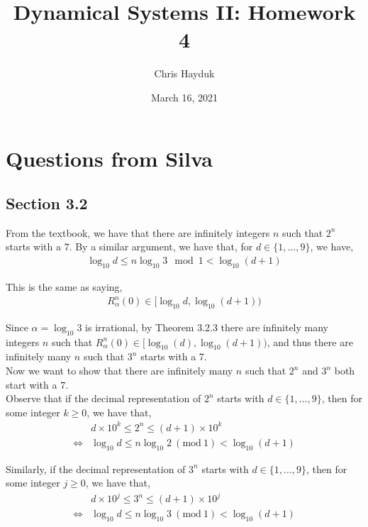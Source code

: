 \documentclass[12pt]{article}
\newenvironment{problem}[2][Problem]{\begin{trivlist}
\item[\hskip \labelsep {\bfseries #1}\hskip \labelsep {\bfseries #2.}]}{\end{trivlist}}
\newcommand{\Mod}[1]{\ (\mathrm{mod}\ #1)}
\begin{document}
\title{Dynamical Systems II: Homework 4}

\author{Chris Hayduk}
\date{March 16, 2021}

\maketitle

\section{Questions from Silva}

\subsection{Section 3.2}

\begin{problem}{10}
\end{problem}

From the textbook, we have that there are infinitely integers $n$ such that $2^n$ starts with a $7$. By a similar argument, we have that, for $d \in \{1, \ldots, 9\}$, we have,
\begin{align*}
\log_{10} d \leq n \log_{10} 3 \mod{1} < \log_{10}(d+1)
\end{align*}

This is the same as saying,
\begin{align*}
R_{\alpha}^n(0) \in [\log_{10} d, \log_{10}(d+1))
\end{align*}

Since $\alpha = \log_{10} 3$ is irrational, by Theorem 3.2.3 there are infinitely many integers $n$ such that $R^n_{\alpha}(0) \in [\log_{10}(d), \log_{10}(d+1))$, and thus there are infinitely many $n$ such that $3^n$ starts with a $7$.\\

Now we want to show that there are infinitely many $n$ such that $2^n$ and $3^n$ both start with a $7$.\\

Observe that if the decimal representation of $2^n$ starts with $d \in \{1, \ldots, 9\}$, then for some integer $k \geq 0$, we have that,
\begin{align}
&d \times 10^k \leq 2^n \leq (d+1) \times 10^k \nonumber \\
\iff &\log_{10} d \leq n \log_{10} 2 \Mod{1} < \log_{10}(d+1)
\end{align}

Similarly, if the decimal representation of $3^n$ starts with $d \in \{1, \ldots, 9\}$, then for some integer $j \geq 0$, we have that,
\begin{align}
&d \times 10^j \leq 3^n \leq (d+1) \times 10^j \nonumber \\
\iff &\log_{10} d \leq n \log_{10} 3 \Mod{1} < \log_{10}(d+1)
\end{align}
\end{document}
